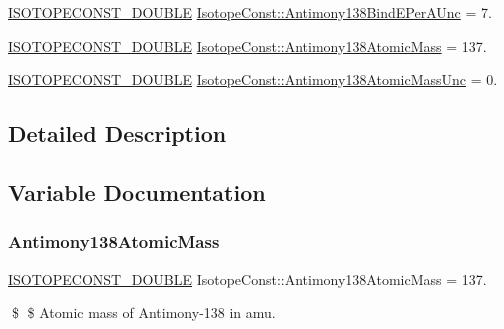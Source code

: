 \begin{DoxyCompactItemize}
\mbox{\hyperlink{group___isotope_const-_macros_ga8f45a7272ce02c0b4c65c44636ed719a}{I\+S\+O\+T\+O\+P\+E\+C\+O\+N\+S\+T\+\_\+\+D\+O\+U\+B\+LE}} \mbox{\hyperlink{group___isotope_const-_antimony-_sb138_gad6a5d48f94e8178d095982cc7a65f4ba}{Isotope\+Const\+::\+Antimony138\+Bind\+E\+Per\+A\+Unc}} = 7.
\item 
\mbox{\hyperlink{group___isotope_const-_macros_ga8f45a7272ce02c0b4c65c44636ed719a}{I\+S\+O\+T\+O\+P\+E\+C\+O\+N\+S\+T\+\_\+\+D\+O\+U\+B\+LE}} \mbox{\hyperlink{group___isotope_const-_antimony-_sb138_gae265250398b2dcea85ca2e45e42f1a5e}{Isotope\+Const\+::\+Antimony138\+Atomic\+Mass}} = 137.
\item 
\mbox{\hyperlink{group___isotope_const-_macros_ga8f45a7272ce02c0b4c65c44636ed719a}{I\+S\+O\+T\+O\+P\+E\+C\+O\+N\+S\+T\+\_\+\+D\+O\+U\+B\+LE}} \mbox{\hyperlink{group___isotope_const-_antimony-_sb138_ga4cb2c8b441d6ece2a134b121f9df9dd2}{Isotope\+Const\+::\+Antimony138\+Atomic\+Mass\+Unc}} = 0.
\end{DoxyCompactItemize}


\subsection{Detailed Description}


\subsection{Variable Documentation}
\mbox{\label{group___isotope_const-_antimony-_sb138_gae265250398b2dcea85ca2e45e42f1a5e}} 
\subsubsection{\texorpdfstring{Antimony138\+Atomic\+Mass}{Antimony138AtomicMass}}
{\footnotesize\ttfamily \mbox{\hyperlink{group___isotope_const-_macros_ga8f45a7272ce02c0b4c65c44636ed719a}{I\+S\+O\+T\+O\+P\+E\+C\+O\+N\+S\+T\+\_\+\+D\+O\+U\+B\+LE}} Isotope\+Const\+::\+Antimony138\+Atomic\+Mass = 137.}

\$ \$ Atomic mass of Antimony-\/138 in amu. \mbox{\label{group___isotope_const-_antimony-_sb138_ga4cb2c8b441d6ece2a134b121f9df9dd2}} 
